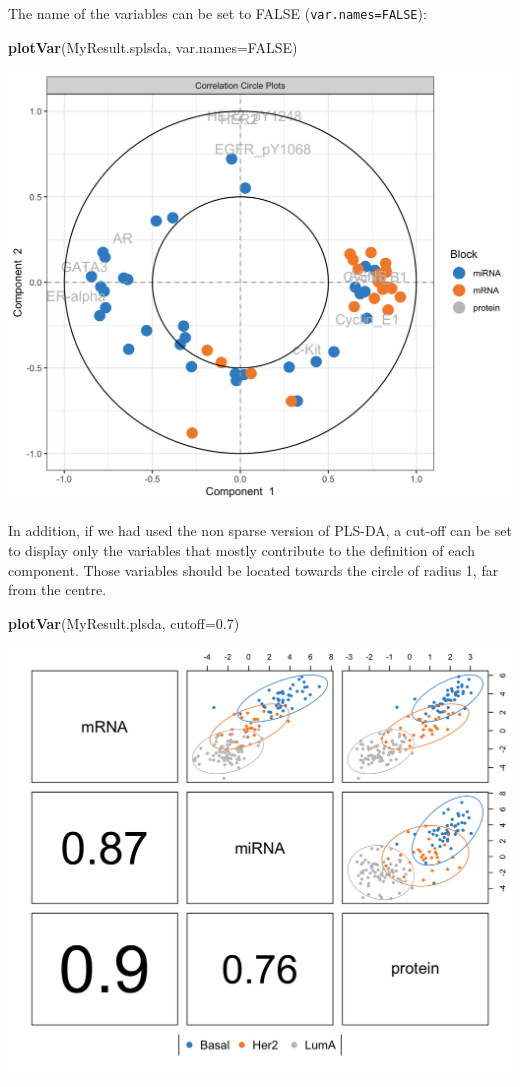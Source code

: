 \documentclass[]{book}
\newenvironment{Shaded}{\begin{snugshade}}{\end{snugshade}}
\newcommand{\KeywordTok}[1]{\textcolor[rgb]{0.13,0.29,0.53}{\textbf{#1}}}
\newcommand{\DataTypeTok}[1]{\textcolor[rgb]{0.13,0.29,0.53}{#1}}
\newcommand{\FloatTok}[1]{\textcolor[rgb]{0.00,0.00,0.81}{#1}}
\newcommand{\OtherTok}[1]{\textcolor[rgb]{0.56,0.35,0.01}{#1}}
\newcommand{\NormalTok}[1]{#1}
\theoremstyle{definition}
\theoremstyle{definition}
\theoremstyle{definition}
\theoremstyle{remark}
\begin{document}
The name of the variables can be set to FALSE
(\texttt{var.names=FALSE}):

\begin{Shaded}
\begin{Highlighting}[]
\KeywordTok{plotVar}\NormalTok{(MyResult.splsda, }\DataTypeTok{var.names=}\OtherTok{FALSE}\NormalTok{)}
\end{Highlighting}
\end{Shaded}

\begin{center}\includegraphics[width=0.5\linewidth]{Figures/unnamed-chunk-5-1} \end{center}

In addition, if we had used the non sparse version of PLS-DA, a cut-off
can be set to display only the variables that mostly contribute to the
definition of each component. Those variables should be located towards
the circle of radius 1, far from the centre.

\begin{Shaded}
\begin{Highlighting}[]
\KeywordTok{plotVar}\NormalTok{(MyResult.plsda, }\DataTypeTok{cutoff=}\FloatTok{0.7}\NormalTok{)}
\end{Highlighting}
\end{Shaded}

\begin{center}\includegraphics[width=0.5\linewidth]{Figures/unnamed-chunk-6-1} \end{center}
\end{document}
